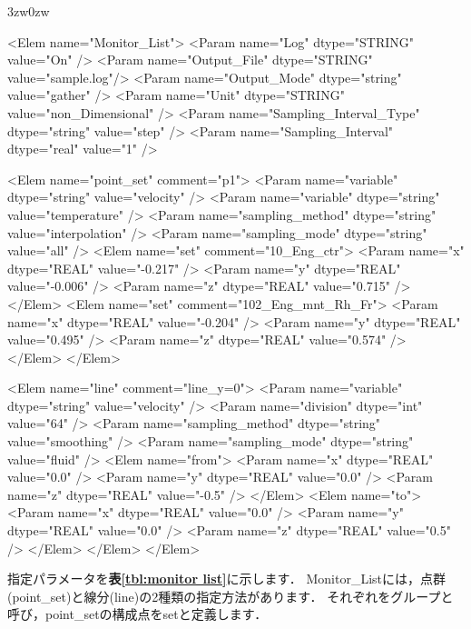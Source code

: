 \begin{indentation}{3zw}{0zw}

{\small
\begin{program}
<Elem name="Monitor_List"> 
  <Param name="Log"                    dtype="STRING" value="On" />
  <Param name="Output_File"            dtype="STRING" value="sample.log"/>
  <Param name="Output_Mode"            dtype="string" value="gather" />
  <Param name="Unit"                   dtype="STRING" value="non_Dimensional" />
  <Param name="Sampling_Interval_Type" dtype="string" value="step" />
  <Param name="Sampling_Interval"      dtype="real"   value="1" />

  <Elem name="point_set" comment="p1"> 
    <Param name="variable"        dtype="string" value="velocity" /> 
    <Param name="variable"        dtype="string" value="temperature" /> 
    <Param name="sampling_method" dtype="string" value="interpolation" /> 
    <Param name="sampling_mode"   dtype="string" value="all" /> 
    <Elem name="set" comment="10_Eng_ctr">
      <Param name="x" dtype="REAL" value="-0.217" /> 
      <Param name="y" dtype="REAL" value="-0.006" /> 
      <Param name="z" dtype="REAL" value="0.715" /> 
    </Elem> 
    <Elem name="set" comment="102_Eng_mnt_Rh_Fr"> 
      <Param name="x" dtype="REAL" value="-0.204" /> 
      <Param name="y" dtype="REAL" value="0.495" /> 
      <Param name="z" dtype="REAL" value="0.574" /> 
    </Elem> 
  </Elem> 

  <Elem name="line" comment="line_y=0"> 
    <Param name="variable"        dtype="string" value="velocity" /> 
    <Param name="division"        dtype="int"    value="64" /> 
    <Param name="sampling_method" dtype="string" value="smoothing" /> 
    <Param name="sampling_mode"   dtype="string" value="fluid" /> 
    <Elem name="from"> 
      <Param name="x" dtype="REAL" value="0.0" /> 
      <Param name="y" dtype="REAL" value="0.0" /> 
      <Param name="z" dtype="REAL" value="-0.5" /> 
    </Elem> 
    <Elem name="to"> 
      <Param name="x" dtype="REAL" value="0.0" /> 
      <Param name="y" dtype="REAL" value="0.0" /> 
      <Param name="z" dtype="REAL" value="0.5" /> 
    </Elem> 
  </Elem> 
</Elem> 
\end{program}
}

指定パラメータを\textbf{表\ref{tbl:monitor list}}に示します．
Monitor\_Listには，点群(point\_set)と線分(line)の2種類の指定方法があります．
それぞれをグループと呼び，point\_setの構成点をsetと定義します．


\end{indentation}
